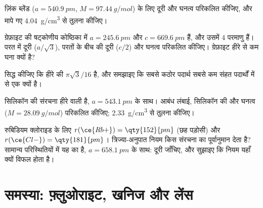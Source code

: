 \begin{exercise}[$\star\star$]\label{exo:b1:crystals-ionic-covalent:8}
ज़िंक ब्लेंड ($a = \qty{540.9}{pm}$, $M = \qty{97.44}{g/mol}$) के लिए
 दूरी और घनत्व परिकलित कीजिए, और मापे गए
\qty{4.04}{g/cm^3} से तुलना कीजिए।
\end{exercise}

\begin{exercise}[$\star\star$]\label{exo:b1:crystals-ionic-covalent:9}
ग्रेफ़ाइट की षट्कोणीय कोष्ठिका में $a = \qty{245.6}{pm}$ और
$c = \qty{669.6}{pm}$ हैं, और उसमें 4 परमाणु हैं। परत में  दूरी
($a/\sqrt3$), परतों के बीच की दूरी ($c/2$) और
घनत्व परिकलित कीजिए। ग्रेफ़ाइट हीरे से कम घना क्यों है?
\end{exercise}

\begin{exercise}[$\star\star\star$]\label{exo:b1:crystals-ionic-covalent:10}
सिद्ध कीजिए कि हीरे की  $\pi\sqrt3/16$ है, और समझाइए कि
सबसे कठोर पदार्थ सबसे कम संहत पदार्थों में से एक क्यों है।
\end{exercise}

\begin{exercise}[$\star\star\star$]\label{exo:b1:crystals-ionic-covalent:11}
सिलिकॉन की संरचना हीरे वाली है, $a = \qty{543.1}{pm}$ के साथ।
 आबंध लंबाई, सिलिकॉन की  और
घनत्व ($M = \qty{28.09}{g/mol}$) परिकलित कीजिए; \qty{2.33}{g/cm^3} से तुलना कीजिए।
\end{exercise}

\begin{exercise}[$\star\star\star$]\label{exo:b1:crystals-ionic-covalent:12}
रुबिडियम क्लोराइड के लिए $r(\ce{Rb+}) = \qty{152}{pm}$ (छह पड़ोसी) और
$r(\ce{Cl-}) = \qty{181}{pm}$। त्रिज्या-अनुपात नियम किस संरचना का
पूर्वानुमान देता है? सामान्य परिस्थितियों में यह  का है,
$a = \qty{658.1}{pm}$ के साथ:  दूरी जाँचिए, और सुझाइए कि
नियम यहाँ क्यों विफल होता है।
\end{exercise}

\section{समस्या: फ़्लुओराइट, खनिज और लेंस}


